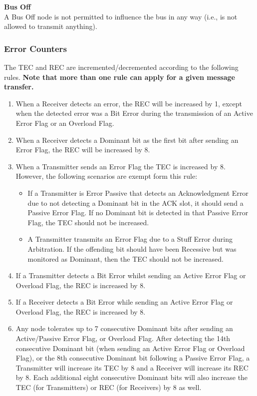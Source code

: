 \documentclass[main\_\_EN.tex]{subfiles}
\begin{document}
{\bfseries Bus Off}\\
A Bus Off node is not permitted to influence the bus in any way (i.e., is not allowed to transmit anything).

\subsubsection{Error Counters}

The TEC and REC are incremented/decremented according to the following rules. {\bfseries Note that more than one rule can apply for a given message transfer.}

\begin{enumerate}
    \item When a Receiver detects an error, the REC will be increased by 1, except when the detected error was a Bit Error during the transmission of an Active Error Flag or an Overload Flag.
    \item When a Receiver detects a Dominant bit as the first bit after sending an Error Flag, the REC will be increased by 8.
    \item When a Transmitter sends an Error Flag the TEC is increased by 8. However, the following scenarios are exempt form this rule:
    \begin{itemize}
        \item If a Transmitter is Error Passive that detects an Acknowledgment Error due to not detecting a Dominant bit in the ACK slot, it should send a Passive Error Flag. If no Dominant bit is detected in that Passive Error Flag, the TEC should not be increased.
        \item A Transmitter transmits an Error Flag due to a Stuff Error during Arbitration. If the offending bit should have been Recessive but was monitored as Dominant, then the TEC should not be increased.
    \end{itemize}
    \item If a Transmitter detects a Bit Error whilst sending an Active Error Flag or Overload Flag, the REC is increased by 8.
    \item If a Receiver detects a Bit Error while sending an Active Error Flag or Overload Flag, the REC is increased by 8.
    \item Any node tolerates up to 7 consecutive Dominant bits after sending an Active/Passive Error Flag, or Overload Flag. After detecting the 14th consecutive Dominant bit (when sending an Active Error Flag or Overload Flag), or the 8th consecutive Dominant bit following a Passive Error Flag, a Transmitter will increase its TEC by 8 and a Receiver will increase its REC by 8. Each additional eight consecutive Dominant bits will also increase the TEC (for Transmitters) or REC (for Receivers) by 8 as well.

\end{enumerate}
\end{document}
